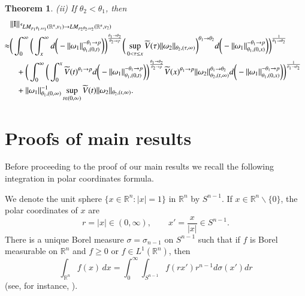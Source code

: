 \documentclass[11pt]{amsart}
\theoremstyle{plain}
\newtheorem{thm}{Theorem}[section]
\theoremstyle{definition}
\numberwithin{thm}{section}
\numberwithin{equation}{section}
\begin{document}
\begin{thm}
	{\rm (ii)} If ${\theta}_2 < {\theta}_1$, then
	\begin{align*}
	\|{\operatorname{I}}\|_{{\,^{^{\bf c}}\!} LM_{p_1{\theta}_1,{\omega}_1}({{\mathbb R}^n},v_1){\rightarrow} LM_{p_2{\theta}_2,{\omega}_2}({{\mathbb R}^n},v_2)} & \\
	& \hspace{-4.5cm}{\approx} \bigg(\int_0^{\infty} \bigg(\int_x^{\infty} d\bigg(- \|{\omega}_1\|_{{\theta}_1,(0,t)}^{-{\theta}_1{\rightarrow} p}\bigg)\bigg)^{\frac{{\theta}_1{\rightarrow} {\theta}_2}{{\theta}_2 {\rightarrow} p}}  \bigg(\sup_{0 < \tau \leq x} \widetilde V(\tau) \|{\omega}_2\|_{{\theta}_2,(\tau,\infty)}\bigg)^{{\theta}_1 {\rightarrow} {\theta}_2} d\bigg(-\|{\omega}_1\|_{{\theta}_1,(0,x)}^{-{\theta}_1 {\rightarrow} p}\bigg)\bigg)^{\frac{1}{{\theta}_1 {\rightarrow} {\theta}_2}} \\
	& \hspace{-4cm} + \bigg(\int_0^{\infty} \bigg(\int_0^x \widetilde V(t)^{{\theta}_1{\rightarrow} p} d\bigg(-\|{\omega}_1\|_{{\theta}_1,(0,t)}^{-{\theta}_1{\rightarrow} p} \bigg) \bigg)^{\frac{{\theta}_1{\rightarrow} {\theta}_2}{{\theta}_2{\rightarrow} p}} \widetilde V(x)^{{\theta}_1{\rightarrow} p} \|{\omega}_2\|_{{\theta}_2,(t,\infty)}^{{\theta}_1{\rightarrow} {\theta}_2} d\bigg(-\|{\omega}_1\|_{{\theta}_1,(0,x)}^{-{\theta}_1{\rightarrow} p} \bigg)\bigg)^{\frac{1}{{\theta}_1{\rightarrow} {\theta}_2}}\\
	& \hspace{-4cm} + \|{\omega}_1\|_{{\theta}_1,(0,\infty)}^{-1} \sup_{t\in (0,{\infty})} \widetilde V(t) \|{\omega}_2\|_{{\theta}_2,(t,\infty)}.
	\end{align*}
\end{thm}

\section{Proofs of main results}\label{s7}

Before proceeding to the proof of our main results we recall the following integration in polar coordinates formula. 

We denote the unit sphere $\{x\in {{\mathbb R}^n} : |x|=1\}$ in ${{\mathbb R}^n}$ by $S^{n-1}$. If $x\in {{\mathbb R}^n} \backslash \{0\}$, the polar coordinates of $x$ are
$$
r=|x| \in (0,\infty), \qquad x'=\frac{x}{|x|} \in S^{n-1}.
$$
There is a unique Borel measure $\sigma = \sigma_{n-1}$ on $S^{n-1}$ such that if $f$ is Borel measurable on ${{\mathbb R}^n}$ and $f\geq 0$ or $f\in L^1({{\mathbb R}^n})$, then 
$$
\int_{{\mathbb R}^n} f(x) \,dx = \int_0^{\infty} \int_{S^{n-1}} f(rx') r^{n-1} d\sigma(x') dr
$$
(see, for instance, \cite[p. 78]{Folland}).
\end{document}
